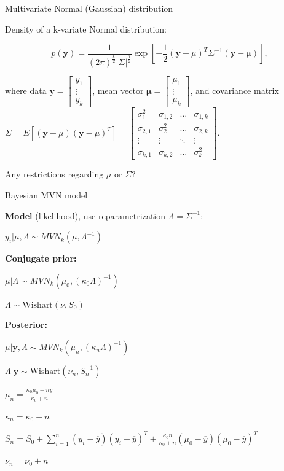 \begin{frame}{Multivariate Normal (Gaussian) distribution}

Density of a k-variate Normal distribution:

$$p(\mathbf{y}) = \frac{1}{(2\pi)^{\frac{k}{2}}|\Sigma|^\frac{1}{2}} \exp\left[-\frac{1}{2}(\mathbf{y}-\mathbb{\mu})^T\Sigma^{-1}(\mathbf{y}-\mathbf{\mu})\right],$$

\bigskip

where data $\mathbf{y} = \begin{bmatrix} y_1 \\ \vdots \\ y_k
\end{bmatrix}$, mean vector $\mathbf{\mu} = \begin{bmatrix} \mu_1 \\ \vdots \\ \mu_k
\end{bmatrix}$, and covariance matrix $\Sigma = E[(\textbf{y} - \mu)(\textbf{y} - \mu)^T] = \begin{bmatrix} \sigma_1^2 & \sigma_{1,2} & \dots & \sigma_{1,k}\\ \sigma_{2,1} & \sigma_2^2 & \dots & \sigma_{2,k}\\ \vdots &  \vdots & \ddots & \vdots\\  \sigma_{k,1} & \sigma_{k,2} & \dots & \sigma_k^2
\end{bmatrix}$.

\bigskip

Any restrictions regarding $\mu$ or $\Sigma$?

\end{frame}

\begin{frame}{Bayesian MVN model}

\begin{small}
\textbf{Model }(likelihood), use reparametrization $\Lambda = \Sigma^{-1}$:

$y_i|\mu, \Lambda \sim MVN_k(\mu, \Lambda^{-1})$

\smallskip

\textbf{Conjugate prior:}

$\mu | \Lambda \sim MVN_k(\mu_0, (\kappa_0\Lambda)^{-1})$

$\Lambda \sim \text{Wishart}(\nu, S_0)$

\smallskip

\textbf{Posterior:}

$\mu | \pmb y, \Lambda \sim MVN_k(\mu_n, (\kappa_n\Lambda)^{-1})$

$\Lambda | \pmb y \sim \text{Wishart}(\nu_n, S_n^{-1})$

$\mu_n = \frac{\kappa_0\mu_0 + n\overline{y}}{\kappa_0 + n}$

$\kappa_n = \kappa_0 + n$

$S_n = S_0 + \sum_{i = 1}^n (y_i - \overline{y})(y_i - \overline{y})^T + \frac{\kappa_0 n}{\kappa_0 + n}(\mu_0 - \overline{y})(\mu_0 - \overline{y})^T$

$\nu_n = \nu_0 + n$
\end{small}
\end{frame}


